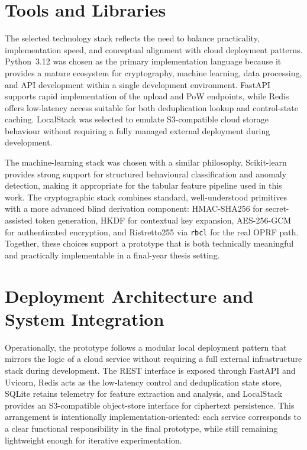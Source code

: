 \documentclass[12pt,a4paper,oneside]{report}
\begin{document}
\section{Tools and Libraries}

The selected technology stack reflects the need to balance practicality, implementation speed, and conceptual alignment with cloud deployment patterns. Python~3.12 was chosen as the primary implementation language because it provides a mature ecosystem for cryptography, machine learning, data processing, and API development within a single development environment. FastAPI supports rapid implementation of the upload and PoW endpoints, while Redis offers low-latency access suitable for both deduplication lookup and control-state caching. LocalStack was selected to emulate S3-compatible cloud storage behaviour without requiring a fully managed external deployment during development.

The machine-learning stack was chosen with a similar philosophy. Scikit-learn provides strong support for structured behavioural classification and anomaly detection, making it appropriate for the tabular feature pipeline used in this work. The cryptographic stack combines standard, well-understood primitives with a more advanced blind derivation component: HMAC-SHA256 for secret-assisted token generation, HKDF for contextual key expansion, AES-256-GCM for authenticated encryption, and Ristretto255 via \texttt{rbcl} for the real OPRF path. Together, these choices support a prototype that is both technically meaningful and practically implementable in a final-year thesis setting.

\section{Deployment Architecture and System Integration}

Operationally, the prototype follows a modular local deployment pattern that mirrors the logic of a cloud service without requiring a full external infrastructure stack during development. The REST interface is exposed through FastAPI and Uvicorn, Redis acts as the low-latency control and deduplication state store, SQLite retains telemetry for feature extraction and analysis, and LocalStack provides an S3-compatible object-store interface for ciphertext persistence. This arrangement is intentionally implementation-oriented: each service corresponds to a clear functional responsibility in the final prototype, while still remaining lightweight enough for iterative experimentation.
\end{document}
